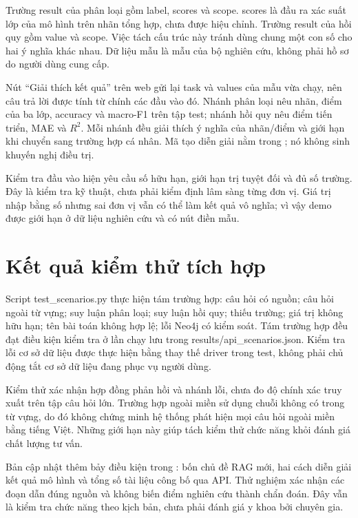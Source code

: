 Trường result của phân loại gồm label, scores và scope. scores là đầu ra xác suất lớp của mô hình trên nhãn tổng hợp, chưa được hiệu chỉnh. Trường result của hồi quy gồm value và scope. Việc tách cấu trúc này tránh dùng chung một con số cho hai ý nghĩa khác nhau. Dữ liệu mẫu là mẫu của bộ nghiên cứu, không phải hồ sơ do người dùng cung cấp.

Nút ``Giải thích kết quả'' trên web gửi lại task và values của mẫu vừa chạy, nên câu trả lời được tính từ chính các đầu vào đó. Nhánh phân loại nêu nhãn, điểm của ba lớp, accuracy và macro-F1 trên tập test; nhánh hồi quy nêu điểm tiến triển, MAE và $R^2$. Mỗi nhánh đều giải thích ý nghĩa của nhãn/điểm và giới hạn khi chuyển sang trường hợp cá nhân. Mã tạo diễn giải nằm trong ; nó không sinh khuyến nghị điều trị.

Kiểm tra đầu vào hiện yêu cầu số hữu hạn, giới hạn trị tuyệt đối và đủ số trường. Đây là kiểm tra kỹ thuật, chưa phải kiểm định lâm sàng từng đơn vị. Giá trị nhập bằng số nhưng sai đơn vị vẫn có thể làm kết quả vô nghĩa; vì vậy demo được giới hạn ở dữ liệu nghiên cứu và có nút điền mẫu.
\section{Kết quả kiểm thử tích hợp}
Script test\_scenarios.py thực hiện tám trường hợp: câu hỏi có nguồn; câu hỏi ngoài từ vựng; suy luận phân loại; suy luận hồi quy; thiếu trường; giá trị không hữu hạn; tên bài toán không hợp lệ; lỗi Neo4j có kiểm soát. Tám trường hợp đều đạt điều kiện kiểm tra ở lần chạy lưu trong results/api\_scenarios.json. Kiểm tra lỗi cơ sở dữ liệu được thực hiện bằng thay thế driver trong test, không phải chủ động tắt cơ sở dữ liệu đang phục vụ người dùng.

Kiểm thử xác nhận hợp đồng phản hồi và nhánh lỗi, chưa đo độ chính xác truy xuất trên tập câu hỏi lớn. Trường hợp ngoài miền sử dụng chuỗi không có trong từ vựng, do đó không chứng minh hệ thống phát hiện mọi câu hỏi ngoài miền bằng tiếng Việt. Những giới hạn này giúp tách kiểm thử chức năng khỏi đánh giá chất lượng tư vấn.

Bản cập nhật thêm bảy điều kiện trong : bốn chủ đề RAG mới, hai cách diễn giải kết quả mô hình và tổng số tài liệu công bố qua API. Thử nghiệm xác nhận các đoạn dẫn đúng nguồn và không biến điểm nghiên cứu thành chẩn đoán. Đây vẫn là kiểm tra chức năng theo kịch bản, chưa phải đánh giá y khoa bởi chuyên gia.
